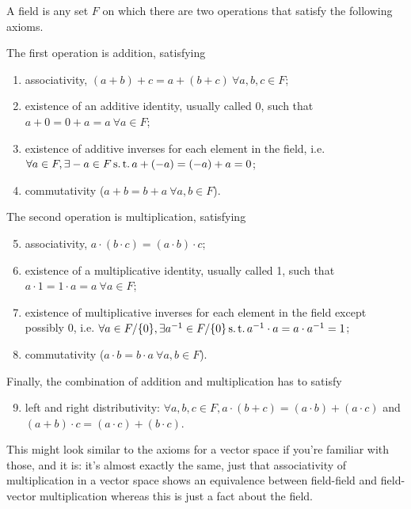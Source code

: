 \documentclass[./analysis.tex]{subfiles}
\begin{document}
    A field is any set $F$ on which there are two operations that satisfy the following axioms. 
    
    The first operation is addition, satisfying 
    \begin{enumerate}
        \item associativity, $(a + b) + c = a + (b + c) \ \forall a, b, c \in F$;
        \item existence of an additive identity, usually called 0, such that $a + 0 = 0 + a = a \ \forall a \in F$;
        \item existence of additive inverses for each element in the field, i.e. $\forall a \in F, \exists -a \in F \operatorname{s.t.} a + (-a) = (-a) + a = 0$;
        \item commutativity ($a + b = b + a \ \forall a, b \in F$).
    \end{enumerate}

    The second operation is multiplication, satisfying
    \begin{enumerate}
        \setcounter{enumi}{4}
        \item associativity, $a\cdot(b\cdot c) = (a\cdot b)\cdot c$;
        \item existence of a multiplicative identity, usually called 1, such that $a \cdot 1 = 1 \cdot a = a \ \forall a \in F$;
        \item existence of multiplicative inverses for each element in the field except possibly 0, i.e. $\forall a \in F/\{0\}, \exists a^{-1} \in F/\{0\} \operatorname{s.t.} a^{-1} \cdot a = a \cdot a^{-1} = 1$;
        \item commutativity ($a \cdot b = b \cdot a \ \forall a, b \in F$).
    \end{enumerate}    
    
    Finally, the combination of addition and multiplication has to satisfy 
    
    \begin{enumerate}
        \setcounter{enumi}{8}
        \item left and right distributivity: $\forall a, b, c \in F, a \cdot (b + c) = (a \cdot b) + (a \cdot c)$ and $(a + b) \cdot c = (a \cdot c) + (b \cdot c)$.
    \end{enumerate}

    This might look similar to the axioms for a vector space if you're familiar with those, and it is: it's almost exactly the same, just that associativity of multiplication in a vector space shows an equivalence between field-field and field-vector multiplication whereas this is just a fact about the field.
\end{document}
